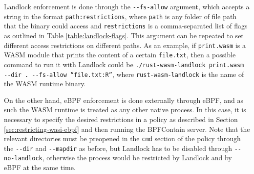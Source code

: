 Landlock enforcement is done through the \texttt{-{}-fs-allow} argument, which accepts a string in the format
\texttt{path:restrictions}, where \texttt{path} is any folder of file path that the binary could access
and \texttt{restrictions} is a comma-separated list of flags as outlined in Table \ref{table:landlock-flags}.
This argument can be repeated to set different access restrictions on different paths.
As an example, if \texttt{print.wasm} is a WASM module that prints the content of a certain \texttt{file.txt},
then a possible command to run it with Landlock could be \texttt{./rust-wasm-landlock print.wasm -{}-dir . -{}-fs-allow ``file.txt:R''},
where \texttt{rust-wasm-landlock} is the name of the WASM runtime binary.

On the other hand, eBPF enforcement is done externally through eBPF, and as such the WASM runtime is treated
as any other native process. In this case, it is necessary to specify the desired restrictions in a policy as described in
Section \ref{sec:restricting-wasi-ebpf} and then running the BPFContain server.
Note that the relevant directories must be preopened in the \texttt{cmd} section of the policy
through the \texttt{-{}-dir} and \texttt{-{}-mapdir} as before, but Landlock has to be
disabled through \texttt{-{}-no-landlock}, otherwise the process would be restricted by
Landlock and by eBPF at the same time.